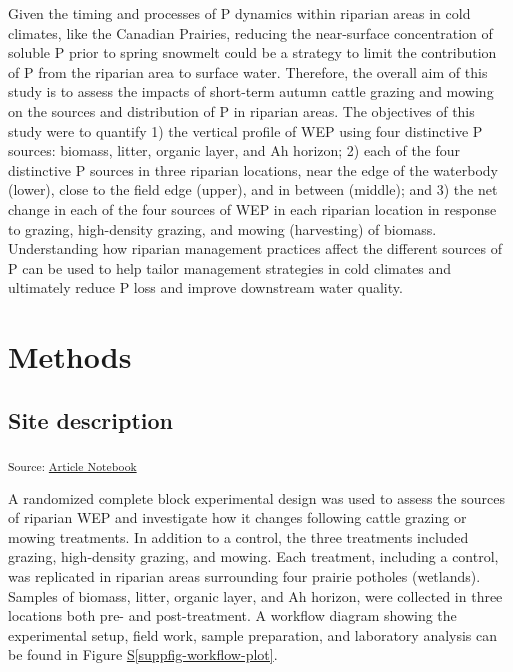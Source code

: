 \documentclass[
]{agujournal2019}
\newcommand*\quartosuppfigref[1]{Figure \hyperref[#1]{S\ref{#1}}}
\begin{document}
Given the timing and processes of P dynamics within riparian areas in
cold climates, like the Canadian Prairies, reducing the near-surface
concentration of soluble P prior to spring snowmelt could be a strategy
to limit the contribution of P from the riparian area to surface water.
Therefore, the overall aim of this study is to assess the impacts of
short-term autumn cattle grazing and mowing on the sources and
distribution of P in riparian areas. The objectives of this study were
to quantify 1) the vertical profile of WEP using four distinctive P
sources: biomass, litter, organic layer, and Ah horizon; 2) each of the
four distinctive P sources in three riparian locations, near the edge of
the waterbody (lower), close to the field edge (upper), and in between
(middle); and 3) the net change in each of the four sources of WEP in
each riparian location in response to grazing, high-density grazing, and
mowing (harvesting) of biomass. Understanding how riparian management
practices affect the different sources of P can be used to help tailor
management strategies in cold climates and ultimately reduce P loss and
improve downstream water quality.

\section{Methods}\label{methods}

\subsection{Site description}\label{site-description}

\textsubscript{Source:
\href{https://alex-koiter.github.io/riparian-grazing-manuscript/index.qmd.html}{Article
Notebook}}

A randomized complete block experimental design was used to assess the
sources of riparian WEP and investigate how it changes following cattle
grazing or mowing treatments. In addition to a control, the three
treatments included grazing, high-density grazing, and mowing. Each
treatment, including a control, was replicated in riparian areas
surrounding four prairie potholes (wetlands). Samples of biomass,
litter, organic layer, and Ah horizon, were collected in three locations
both pre- and post-treatment. A workflow diagram showing the
experimental setup, field work, sample preparation, and laboratory
analysis can be found in \quartosuppfigref{suppfig-workflow-plot}.
\end{document}
